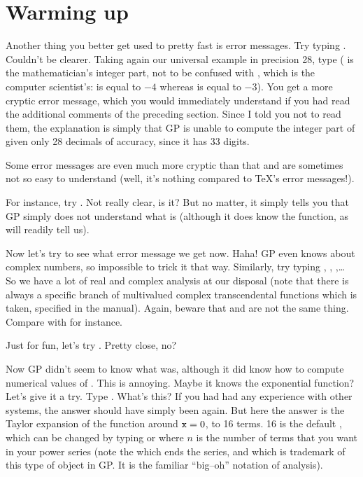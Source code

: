 \section{Warming up}

Another thing you better get used to pretty fast is error messages. Try
typing . Couldn't be clearer. Taking again our universal example in
precision 28, type  ( is the
mathematician's integer part, not to be confused with , which is
the computer scientist's:  is equal to $-4$ whereas
 is equal to $-3$).  You get a more cryptic error message,
which you would immediately understand if you had read the additional
comments of the preceding section. Since I told you not to read them, the
explanation is simply that GP is unable to compute the integer part of
 given only 28 decimals of accuracy, since it has 33 digits.

Some error messages are even much more cryptic than that and are sometimes
not so easy to understand (well, it's nothing compared to \TeX's error
messages!).

For instance, try . Not really clear, is it? But no matter, it
simply tells you that GP simply does not understand what  is
(although it does know the  function, as  will readily
tell us).

Now let's try  to see what error message we get now. Haha! GP
even knows about complex numbers, so impossible to trick it that way.
Similarly, try typing , , ,\dots
So we have a lot of real and complex analysis at our disposal (note that
there is always a specific branch of multivalued complex transcendental
functions which is taken, specified in the manual). Again, beware that
 and  are not the same thing. Compare  with
 for instance.

Just for fun, let's try . Pretty close, no?

\medskip
Now GP didn't seem to know what  was, although it did know how to
compute numerical values of . This is annoying. Maybe it knows the
exponential function? Let's give it a try. Type . What's this? If
you had had any experience with other systems, the answer should have simply
been  again. But here the answer is the Taylor expansion of the
function around ${\tt x}=0$, to 16 terms. 16 is the default
, which can be changed by typing  or
 where $n$ is the number of terms that you
want in your power series (note the  which ends the series,
and which is trademark of this type of object in GP. It is the familiar
``big--oh'' notation of analysis).

